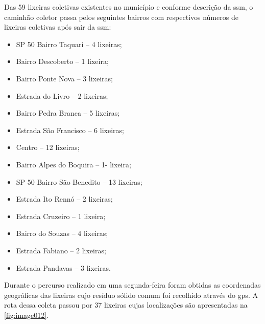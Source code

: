 	
	
	
	Das 59 lixeiras coletivas existentes no município e conforme descrição da \gls{ssm}, o caminhão coletor passa pelos seguintes bairros com respectivos números de lixeiras coletivas após sair da \gls{ssm}:

	\begin{itemize}
		\item SP 50 Bairro Taquari – 4 lixeiras; 
		\item Bairro Descoberto – 1 lixeira; 
		\item Bairro Ponte Nova – 3 lixeiras; 
		\item Estrada do Livro – 2 lixeiras; 
		\item Bairro Pedra Branca – 5 lixeiras; 
		\item Estrada São Francisco – 6 lixeiras; 
		\item Centro – 12 lixeiras; 
		\item Bairro Alpes do Boquira – 1- lixeira; 
		\item SP 50 Bairro São Benedito – 13 lixeiras; 
		\item Estrada Ito Rennó – 2 lixeiras; 
		\item Estrada Cruzeiro – 1 lixeira; 
		\item Bairro do Souzas – 4 lixeiras; 
		\item Estrada Fabiano – 2 lixeiras; 
		\item Estrada Pandavas – 3 lixeiras.
	\end{itemize}

	Durante o percurso realizado em uma segunda-feira foram obtidas as coordenadas geográficas das lixeiras cujo resíduo sólido comum foi recolhido através do \gls{gps}. A rota dessa coleta passou por 37 lixeiras cujas localizações são apresentadas na \autoref{fig:image012}. 
	
